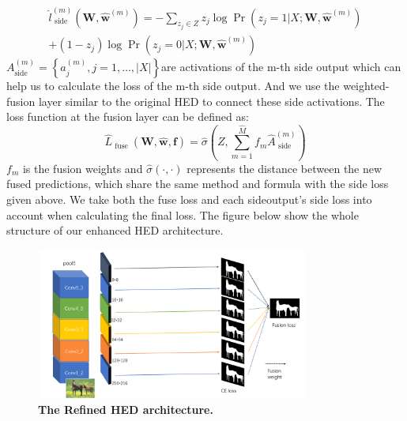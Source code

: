 \documentclass[10pt,journal, compsoc]{IEEEtran}
\begin{document}
\begin{equation}
\begin{array} { c } { \hat { l } _ { \text { side } } ^ { ( m ) } \left( \mathbf { W } , \hat { \mathbf { w } } ^ { ( m ) } \right) = - \sum_{ z _ { j } \in Z } z _ { j } \log \operatorname { Pr } \left( z _ { j } = 1 | X ; \mathbf { W } , \hat { \mathbf { w } } ^ { ( m ) } \right) } \\ { + \left( 1 - z _ { j } \right) \log \operatorname { Pr } \left( z _ { j } = 0 | X ; \mathbf { W } , \hat { \mathbf { w } } ^ { ( m ) } \right) } \end{array}
\end{equation}
$A _ { \text {side} } ^ { ( m ) } = \left\{ a _ { j } ^ { ( m ) } , j = 1 , \ldots , | X | \right\}$are activations of the m-th side output which can help us to calculate the loss of the m-th side output.
And we use the weighted-fusion layer similar to the original HED to connect these side activations. The loss function at the fusion layer can be defined as:
\begin{equation}
\hat { L } _ { \text { fuse } } ( \mathbf { W } , \hat { \mathbf { w } } , \mathbf { f } ) = \hat { \sigma } \left( Z , \sum _ { m = 1 } ^ { \hat { M } } f _ { m } \hat { A } _ { \text { side } } ^ { ( m ) } \right)
\end{equation}
$f_m$ is the fusion weights and $\hat { \sigma } ( \cdot , \cdot )$ represents the distance between the new fused predictions, which share the same method and formula with the side loss given above. We take both the fuse loss and each sideoutput’s side loss into account when calculating the final loss.
The figure below show the whole structure of our enhanced HED architecture.
\begin{figure}[h]
	\centering
	\includegraphics[height=5.0cm,width=9.0cm]{figures/HED.png}
	\caption{\textbf{The Refined HED architecture.}}
\end{figure}
\end{document}
